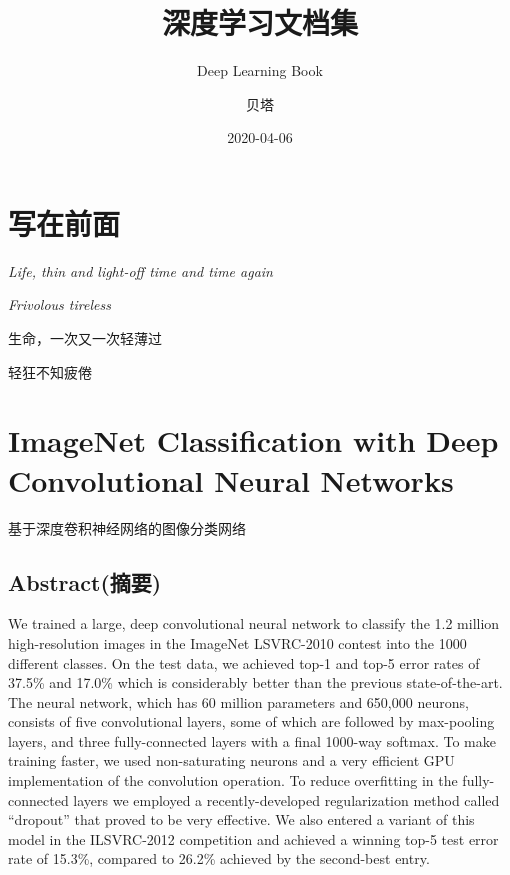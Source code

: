 \documentclass[12pt,a4paper,UTF8,twoside]{book}
\title{深度学习文档集}
\subtitle{Deep Learning Book}
\author{贝塔}
\date{2020-04-06}
\begin{document}





{
\setcounter{tocdepth}{2}
\tableofcontents
}

\hypertarget{ux5199ux5728ux524dux9762}{%
\chapter{写在前面}\label{ux5199ux5728ux524dux9762}}

\emph{Life, thin and light-off time and time again}

\emph{Frivolous tireless}

生命，一次又一次轻薄过

轻狂不知疲倦

\hypertarget{Alexnet}{%
\chapter{ImageNet Classification with Deep Convolutional Neural Networks}\label{Alexnet}}

基于深度卷积神经网络的图像分类网络

\hypertarget{abstractux6458ux8981}{%
\section{Abstract(摘要)}\label{abstractux6458ux8981}}

We trained a large, deep convolutional neural network to classify the 1.2 million high-resolution images in the ImageNet LSVRC-2010 contest into the 1000 different classes. On the test data, we achieved top-1 and top-5 error rates of 37.5\% and 17.0\% which is considerably better than the previous state-of-the-art. The neural network, which has 60 million parameters and 650,000 neurons, consists of five convolutional layers, some of which are followed by max-pooling layers, and three fully-connected layers with a final 1000-way softmax. To make training faster, we used non-saturating neurons and a very efficient GPU implementation of the convolution operation. To reduce overfitting in the fully-connected layers we employed a recently-developed regularization method called ``dropout'' that proved to be very effective. We also entered a variant of this model in the ILSVRC-2012 competition and achieved a winning top-5 test error rate of 15.3\%, compared to 26.2\% achieved by the second-best entry.
\end{document}
